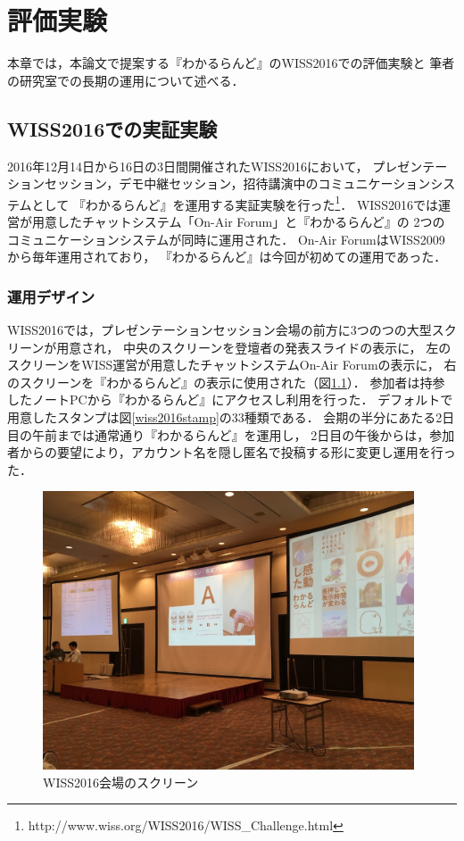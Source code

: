 \chapter{評価実験}
\label{chap:experiment}

本章では，本論文で提案する『わかるらんど』のWISS2016での評価実験と
筆者の研究室での長期の運用について述べる．

\newpage

\section{WISS2016での実証実験}
2016年12月14日から16日の3日間開催されたWISS2016において，
プレゼンテーションセッション，デモ中継セッション，招待講演中のコミュニケーションシステムとして
『わかるらんど』を運用する実証実験を行った\footnote{http://www.wiss.org/WISS2016/WISS\_Challenge.html}．
WISS2016では運営が用意したチャットシステム「On-Air Forum」と『わかるらんど』の
2つのコミュニケーションシステムが同時に運用された．
On-Air ForumはWISS2009から毎年運用されており，
『わかるらんど』は今回が初めての運用であった．

\subsection{運用デザイン}
WISS2016では，プレゼンテーションセッション会場の前方に3つのつの大型スクリーンが用意され，
中央のスクリーンを登壇者の発表スライドの表示に，
左のスクリーンをWISS運営が用意したチャットシステムOn-Air Forumの表示に，
右のスクリーンを『わかるらんど』の表示に使用された（図\ref{wiss2016}）．
参加者は持参したノートPCから『わかるらんど』にアクセスし利用を行った．
デフォルトで用意したスタンプは図\ref{wiss2016stamp}の33種類である．
会期の半分にあたる2日目の午前までは通常通り『わかるらんど』を運用し，
2日目の午後からは，参加者からの要望により，アカウント名を隠し匿名で投稿する形に変更し運用を行った．

\begin{figure}[H]
\centering
\includegraphics[width=11cm]{images/wiss2016.png}
\caption{WISS2016会場のスクリーン}
\label{wiss2016}
\end{figure}

